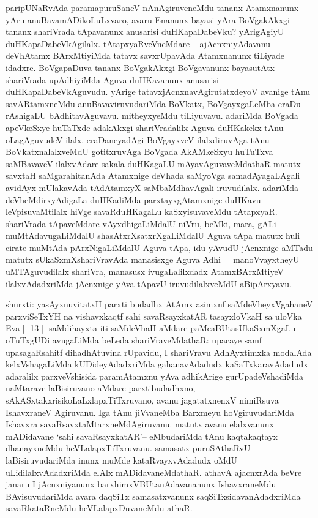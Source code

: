 \begin{artha} %
paripUNaRvAda paramapuruSaneV nAnAgiruveneMdu tananx Atamxnanunx yAru anuBavamADikoLuLxvaro, avaru Enanunx bayasi yAra BoVgakAkxgi tananx shariVrada tApavanunx anusarisi duHKapaDabeVku? yArigAgiyU duHKapaDabeVkAgilalx. tAtapxyaRveVneMdare -- ajAcnxniyAdavanu deVhAtamx BArxMtiyiMda tatavx savxrUpavAda Atamxnanunx tiLiyade idadxre. BoVgapaDuva tananx BoVgakAkxgi BoVgavanunx bayasutAtx shariVrada upAdhiyiMda Aguva duHKavanunx anusarisi duHKapaDabeVkAguvudu. yArige tatavxjAcnxnavAgirutatxdeyoV avanige tAnu savARtamxneMdu anuBavaviruvudariMda BoVkatx, BoVgayxgaLeMba eraDu rAshigaLU bAdhitavAguvavu. mitheyxyeMdu tiLiyuvavu. adariMda BoVgada apeVkeSxye huTaTxde adakAkxgi shariVradalilx Aguva duHKakekx tAnu oLagAguvudeV ilalx. eraDaneyadAgi BoVgayxveV ilalxdiruvAga tAnu BoVkatxnalalxveMdU gotitxruvAga BoVgada AkAMkeSxyu huTuTxva saMBavaveV ilalxvAdare sakala duHKagaLU mAyavAguvaveMdathaR matutx savxtaH saMgarahitanAda Atamxnige deVhada saMyoVga samadAyagaLAgali avidAyx mUlakavAda tAdAtamxyX saMbaMdhavAgali iruvudilalx. adariMda deVheMdirxyAdigaLa duHKadiMda parxtayxgAtamxnige duHKavu leVpisuvaMtilalx hiVge savaRduHKagaLu kaSxyisuvaveMdu tAtapxyaR. shariVrada tApaveMdare vAyxdhigaLiMdalU niVru, beMki, mara, gALi muMtAdavugaLiMdalU shasAtxrXsatxrXgaLiMdalU Aguva tApa matutx huli cirate muMtAda pArxNigaLiMdalU Aguva tApa, idu yAvudU jAcnxnige aMTadu matutx sUkaSxmXshariVravAda manasisxge Aguva Adhi = manoVvayxtheyU uMTAguvudilalx shariVra, manasusx ivugaLalilxdadx AtamxBArxMtiyeV ilalxvAdadxriMda jAcnxnige yAva tApavU iruvudilalxveMdU aBipArxyavu. 
\end{artha}


\vishaya{}

\begin{artha}
shurxti: yasAyxnuvitatxH parxti budadhx AtAmx asimxnf saMdeVheyxVgahaneV parxviSeTxYH na vishavxkaqtf sahi savaRsayxkatAR tasayxloVkaH sa uloVka Eva || 13 || saMdihayxta iti saMdeVhaH aMdare paMcaBUtasUkaSxmXgaLu oTuTxgUDi avugaLiMda beLeda shariVraveMdathaR: upacaye samf upasagaRsahitf dihadhAtuvina rUpavidu, I shariVravu AdhAyxtimxka modalAda kelxVshagaLiMda kUDideyAdadxriMda gahanavAdadudx kaSaTxkaravAdadudx adaralilx parxveVshisida paramAtamxnu yAva adhikArige gurUpadeVshadiMda naMtarave laBisiruvano aMdare parxtibudadhxno, sAkASxtakxrisikoLaLxlapxTiTxruvano, avanu  jagatatxnenxV nimiRsuva IshavxraneV Agiruvanu. Iga tAnu jiVvaneMba Barxmeyu hoVgiruvudariMda Ishavxra savaRsavxtaMtarxneMdAgiruvanu. matutx avanu elalxvanunx mADidavane `sahi savaRsayxkatAR'-- eMbudariMda tAnu kaqtakaqtayx dhanayxneMdu heVLalapxTiTxruvanu. samasatx puruSAthaRvU laBisiruvudariMda inunx muMde kataRvayxvAdadudx oMdU uLidilalxvAdadxriMda elAlx mADidavaneMdathaR. athavA ajacnxrAda beVre janaru I jAcnxniyanunx barxhimxVBUtanAdavananunx IshavxraneMdu BAvisuvudariMda avara daqSiTx samasatxvanunx saqSiTxsidavanAdadxriMda savaRkataRneMdu heVLalapxDuvaneMdu athaR.
\end{artha}

